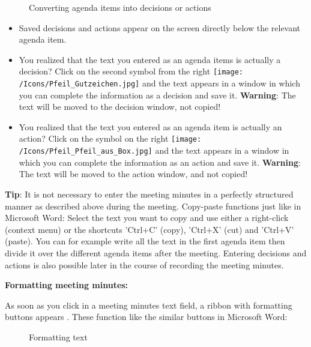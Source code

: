 \begin{figure}[H]
\caption{Converting agenda items into decisions or actions}
\end{figure}

\begin{itemize}
\item
Saved decisions and actions appear on the screen directly below the relevant agenda item.
\item
You realized that the text you entered as an agenda items is actually a decision? Click on the second symbol from the right \texttt{[image: /Icons/Pfeil\_Gutzeichen.jpg]}  and the text appears in a window in which you can complete the information as a decision and save it. \textbf{Warning}: The text will be moved to the decision window, not copied!
\item
You realized that the text you entered as an agenda item is actually an action? Click on the symbol on the right \texttt{[image: /Icons/Pfeil\_Pfeil\_aus\_Box.jpg]}  and the text appears in a window in which you can complete the information as an action and save it. \textbf{Warning}: The text will be moved to the action window, and not copied!
\end{itemize}


\textbf{Tip}: It is not necessary to enter the meeting minutes in a perfectly structured manner as described above during the meeting. Copy-paste functions just like in Microsoft Word: Select the text you want to copy and use either a right-click (context menu) or the shortcuts 'Ctrl+C' (copy), 'Ctrl+X' (cut) and 'Ctrl+V' (paste). You can for example write all the text in the first agenda item then divide it over the different agenda items after the meeting. Entering decisions and actions is also possible later in the course of recording the meeting minutes.

\vspace{\baselineskip}

\textbf{Formatting meeting minutes:}


As soon as you click in a meeting minutes text field, a ribbon with formatting buttons appears . These function like the similar buttons in Microsoft Word:

\begin{figure}[H]
\caption{Formatting text}
\end{figure}

